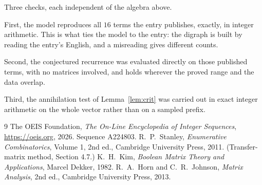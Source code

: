 \documentclass[11pt,a4paper]{article}
\theoremstyle{plain}
\theoremstyle{definition}
\begin{document}
Three checks, each independent of the algebra above.

First, the model reproduces all $16$ terms the entry publishes, exactly, in integer
arithmetic. This is what ties the model to the entry: the digraph is built by reading the
entry's English, and a misreading gives different counts.

Second, the conjectured recurrence was evaluated directly on those published terms, with no
matrices involved, and holds wherever the proved range and the data overlap.

Third, the annihilation test of Lemma~\ref{lem:crit} was carried out in exact integer
arithmetic on the whole vector rather than on a sampled prefix.

\begin{thebibliography}{9}
 The OEIS Foundation, \emph{The On-Line Encyclopedia of Integer
Sequences}, \url{https://oeis.org}, 2026. Sequence A224803.
 R.~P.~Stanley, \emph{Enumerative Combinatorics}, Volume 1, 2nd ed.,
Cambridge University Press, 2011. (Transfer-matrix method, Section 4.7.)
 K.~H.~Kim, \emph{Boolean Matrix Theory and Applications}, Marcel Dekker,
1982.
 R.~A.~Horn and C.~R.~Johnson, \emph{Matrix Analysis}, 2nd ed., Cambridge
University Press, 2013.
\end{thebibliography}
\end{document}
